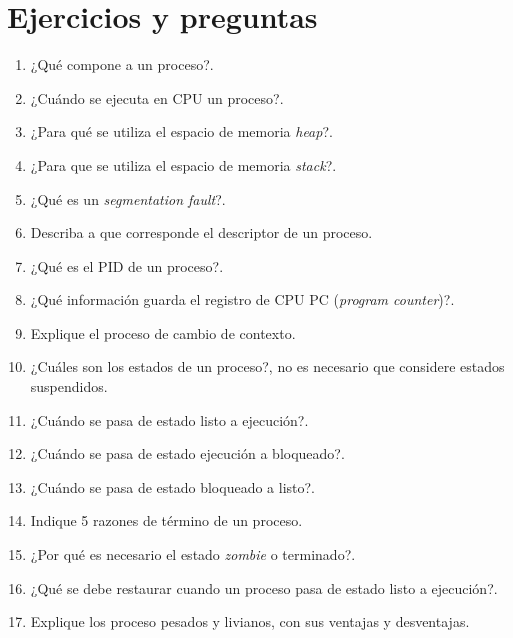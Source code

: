 \section{Ejercicios y preguntas}
\begin{enumerate}

	\item ¿Qué compone a un proceso?.

	\item ¿Cuándo se ejecuta en CPU un proceso?.

	\item ¿Para qué se utiliza el espacio de memoria \textit{heap}?.

	\item ¿Para que se utiliza el espacio de memoria \textit{stack}?.

	\item ¿Qué es un \textit{segmentation fault}?.

	\item Describa a que corresponde el descriptor de un proceso.

	\item ¿Qué es el PID de un proceso?.

	\item ¿Qué información guarda el registro de CPU PC (\textit{program
	counter})?.

	\item Explique el proceso de cambio de contexto.

	\item ¿Cuáles son los estados de un proceso?, no es necesario que
	considere estados suspendidos.

	\item ¿Cuándo se pasa de estado listo a ejecución?.

	\item ¿Cuándo se pasa de estado ejecución a bloqueado?.

	\item ¿Cuándo se pasa de estado bloqueado a listo?.

	\item Indique 5 razones de término de un proceso.

	\item ¿Por qué es necesario el estado \textit{zombie} o terminado?.

	\item ¿Qué se debe restaurar cuando un proceso pasa de estado listo a
	ejecución?.

	\item Explique los proceso pesados y livianos, con sus ventajas y
	desventajas.


\end{enumerate}
